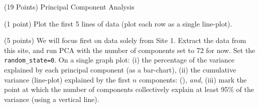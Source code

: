 \documentclass[12pt]{article}
\begin{document}
\begin{question}{(19 Points) Principal Component Analysis}




\begin{subquestion}{(1 point) Plot the first 5 lines of data (plot each row as a single line-plot).}






\end{subquestion}



\begin{subquestion}{(5 points) We will focus first on data solely from Site 1. Extract the data from this site, and run PCA with the number of components set to 72 for now. Set the \texttt{random\_state=0}. On a single graph plot: (i) the percentage of the variance explained by each principal component (as a bar-chart), (ii) the cumulative variance (line-plot) explained by the first $n$ components: (), \textsl{and}, (iii) mark the point at which the number of components collectively explain at least 95\% of the variance (using a vertical line). }




\end{subquestion}
\end{question}
\end{document}
